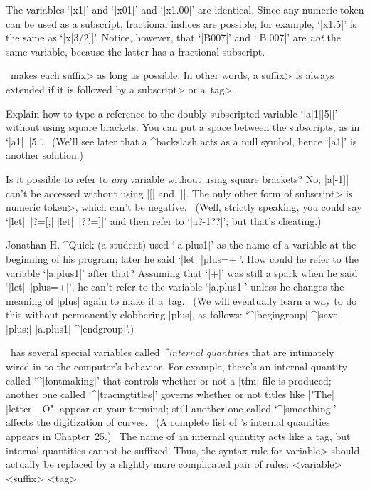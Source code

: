 {\danger The variables `|x1|' and `|x01|' and `|x1.00|' are identical.
Since any numeric token can be used as a subscript, fractional indices
are possible; for example, `|x1.5|' is the same as `|x[3/2]|'. Notice,
however, that `|B007|' and `|B.007|' are {\sl not\/} the same variable,
because the latter has a fractional subscript.

\danger \MF\ makes each \<suffix> as long as possible. In other words,
a \<suffix> is always extended if it is followed by a \<subscript>
or a~\<tag>.

\dangerexercise Explain how to type a reference to the doubly subscripted
variable `|a[1][5]|' without using square brackets.
\answer You can put a space between the subscripts, as in `|a1|~|5|'. \
(We'll see later that a ^{backslash} acts as a null symbol,
hence `|a1\5|' is another solution.)

\dangerexercise Is it possible to refer to {\sl any\/} variable without
using square brackets?
\answer No; |a[-1]| can't be accessed without using |[| and |]|. The
only other form of \<subscript> is \<numeric token>, which can't be
negative. \ (Well, strictly speaking, you could say `|let|~|?=[;|
|let|~|??=]|' and then refer to `|a?-1??|'; but that's cheating.)

\ddangerexercise Jonathan H. ^{Quick} (a student) used `|a.plus1|' as the name
of a variable at the beginning of his program; later he said `|let|
|plus=+|'. How could he refer to the variable `|a.plus1|' after that?
\answer Assuming that `|+|' was still a spark when he said `|let|~|plus=+|',
he can't refer to the variable `|a.plus1|' unless he changes the meaning of
|plus| again to make it a~tag. \ (We will eventually learn a way to do this
without permanently clobbering |plus|, as follows: `^|begingroup| ^|save|
|plus;| |a.plus1| ^|endgroup|'.)

\danger \MF\ has several special variables called {\sl^{internal
quantities}\/} that are intimately wired-in to the computer's behavior.
For example, there's an internal quantity called `^|fontmaking|' that controls
whether or not a |tfm| file is produced; another one called `^|tracingtitles|'
governs whether or not titles like |"The| |letter|~|O"| appear on your
terminal; still another one called `^|smoothing|' affects the digitization of
curves. \ (A complete list of \MF's internal quantities appears in
Chapter~25.) \ The name of an internal quantity acts like a tag, but
internal quantities cannot be suffixed. Thus, the syntax rule for \<variable>
should actually be replaced by a slightly more complicated pair of rules:
\beginsyntax
<variable>\is<external tag><suffix>\alt<internal quantity>
<tag>\is<external tag>\alt<internal quantity>
\endsyntax

}
